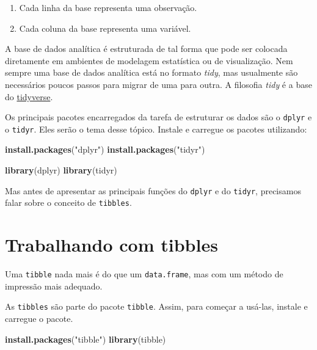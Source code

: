 \documentclass[]{book}
\newenvironment{Shaded}{\begin{snugshade}}{\end{snugshade}}
\newcommand{\KeywordTok}[1]{\textcolor[rgb]{0.13,0.29,0.53}{\textbf{#1}}}
\newcommand{\NormalTok}[1]{#1}
\newcommand{\StringTok}[1]{\textcolor[rgb]{0.31,0.60,0.02}{#1}}
\providecommand{\tightlist}{%
  \setlength{\itemsep}{0pt}\setlength{\parskip}{0pt}}
\begin{document}
\begin{enumerate}
\def\labelenumi{\arabic{enumi}.}
\tightlist
\item
  Cada linha da base representa uma observação.
\item
  Cada coluna da base representa uma variável.
\end{enumerate}

A base de dados analítica é estruturada de tal forma que pode ser colocada diretamente em ambientes de modelagem estatística ou de visualização. Nem sempre uma base de dados analítica está no formato \emph{tidy}, mas usualmente são necessários poucos passos para migrar de uma para outra. A filosofia \emph{tidy} é a base do \href{https://www.tidyverse.org/}{tidyverse}.

Os principais pacotes encarregados da tarefa de estruturar os dados são o \texttt{dplyr} e o \texttt{tidyr}. Eles serão o tema desse tópico. Instale e carregue os pacotes utilizando:

\begin{Shaded}
\begin{Highlighting}[]
\KeywordTok{install.packages}\NormalTok{(}\StringTok{"dplyr"}\NormalTok{)}
\KeywordTok{install.packages}\NormalTok{(}\StringTok{"tidyr"}\NormalTok{)}

\KeywordTok{library}\NormalTok{(dplyr)}
\KeywordTok{library}\NormalTok{(tidyr)}
\end{Highlighting}
\end{Shaded}

Mas antes de apresentar as principais funções do \texttt{dplyr} e do \texttt{tidyr}, precisamos falar sobre o conceito de \texttt{tibbles}.

\hypertarget{trabalhando-com-tibbles}{%
\section{Trabalhando com tibbles}\label{trabalhando-com-tibbles}}

Uma \texttt{tibble} nada mais é do que um \texttt{data.frame}, mas com um método de impressão mais adequado.

As \texttt{tibbles} são parte do pacote \texttt{tibble}. Assim, para começar a usá-las, instale e carregue o pacote.

\begin{Shaded}
\begin{Highlighting}[]
\KeywordTok{install.packages}\NormalTok{(}\StringTok{"tibble"}\NormalTok{)}
\KeywordTok{library}\NormalTok{(tibble)}
\end{Highlighting}
\end{Shaded}
\end{document}
